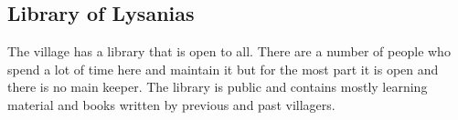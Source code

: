 \subsection{Library of Lysanias}

The village has a library that is open to all. There are a number of people who spend a lot of time here and maintain it but for the most part it is open and there is no main keeper. The library is public and contains mostly learning material and books written by previous and past villagers.